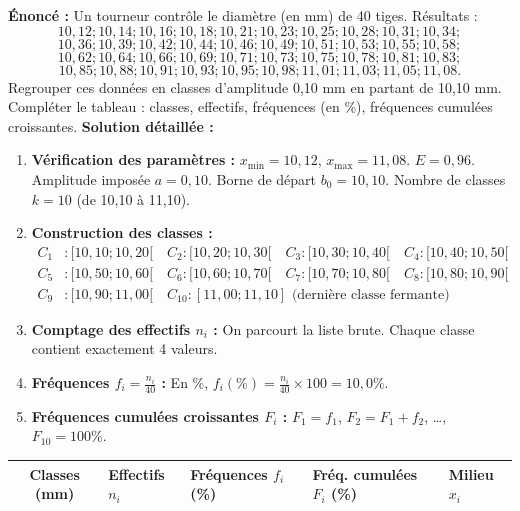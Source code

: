 \documentclass[11pt]{article}
\begin{document}
\begin{exoresolu}
    \textbf{Énoncé :} Un tourneur contrôle le diamètre (en mm) de 40 tiges. Résultats :
    \[10,12; 10,14; 10,16; 10,18; 10,21; 10,23; 10,25; 10,28; 10,31; 10,34;\]
    \[10,36; 10,39; 10,42; 10,44; 10,46; 10,49; 10,51; 10,53; 10,55; 10,58;\]
    \[10,62; 10,64; 10,66; 10,69; 10,71; 10,73; 10,75; 10,78; 10,81; 10,83;\]
    \[10,85; 10,88; 10,91; 10,93; 10,95; 10,98; 11,01; 11,03; 11,05; 11,08.\]
    Regrouper ces données en classes d'amplitude 0,10 mm en partant de 10,10 mm. Compléter le tableau : classes, effectifs, fréquences (en \%), fréquences cumulées croissantes.
    \tcblower
    \textbf{Solution détaillée :}
    \begin{enumerate}
        \item \textbf{Vérification des paramètres :} $x_{\min}=10,12$, $x_{\max}=11,08$. $E = 0,96$. Amplitude imposée $a=0,10$. Borne de départ $b_0=10,10$. Nombre de classes $k=10$ (de 10,10 à 11,10).
        \item \textbf{Construction des classes :}
        \begin{align*}
            C_1 &: [10,10; 10,20[ \quad C_2 : [10,20; 10,30[ \quad C_3 : [10,30; 10,40[ \quad C_4 : [10,40; 10,50[ \\
            C_5 &: [10,50; 10,60[ \quad C_6 : [10,60; 10,70[ \quad C_7 : [10,70; 10,80[ \quad C_8 : [10,80; 10,90[ \\
            C_9 &: [10,90; 11,00[ \quad C_{10} : [11,00; 11,10] \text{ (dernière classe fermante)}
        \end{align*}
        \item \textbf{Comptage des effectifs $n_i$ :} On parcourt la liste brute. Chaque classe contient exactement 4 valeurs.
        \item \textbf{Fréquences $f_i = \frac{n_i}{40}$ :} En \%, $f_i(\%) = \frac{n_i}{40}\times 100 = 10,0\%$.
        \item \textbf{Fréquences cumulées croissantes $F_i$ :} $F_1=f_1$, $F_2=F_1+f_2$, \ldots, $F_{10}=100\%$.
    \end{enumerate}
    \begin{center}
    \begin{tabularx}{\linewidth}{|c|>{\centering\arraybackslash}X|>{\centering\arraybackslash}X|>{\centering\arraybackslash}X|>{\centering\arraybackslash}X|}\hline
    \rowcolor{popblueL}
    \textbf{Classes (mm)} & \textbf{Effectifs $n_i$} & \textbf{Fréquences $f_i$ (\%)} & \textbf{Fréq. cumulées $F_i$ (\%)} & \textbf{Milieu $x_i$} \\ \hline

\end{tabularx}
\end{center}
\end{exoresolu}
\end{document}
